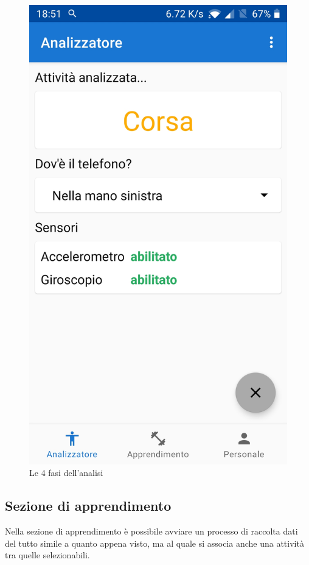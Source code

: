 \begin{figure}[H]
    \includegraphics[scale = 0.1019]{assets/images/screenshots/1d_Prediction.jpg}
    \caption{Le 4 fasi dell'analisi}
    \label{fig:screenshots_analysis}
\end{figure}


\subsection{Sezione di apprendimento}
Nella sezione di apprendimento è possibile avviare un processo di raccolta dati del tutto simile a quanto appena visto, ma al quale si associa anche 
una attività tra quelle selezionabili.

